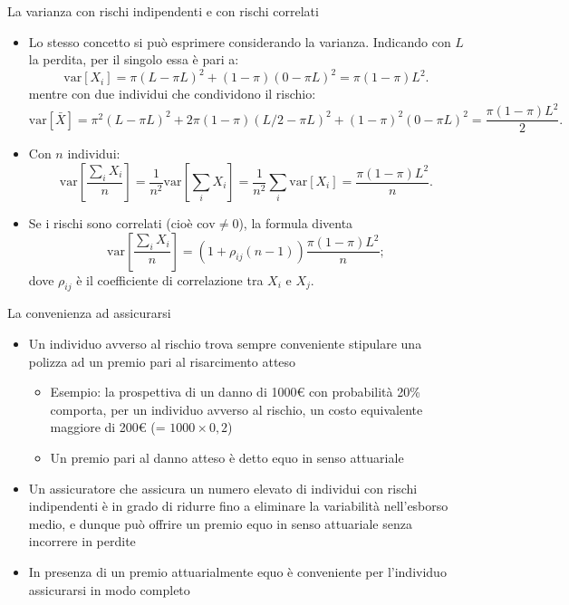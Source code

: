 \documentclass[aspectratio=149,11pt]{beamer}
\begin{document}
\begin{frame}{La varianza con rischi indipendenti e con rischi correlati}
\begin{itemize}
\item Lo stesso concetto si può esprimere considerando la varianza. Indicando con
\(L\) la perdita, per il singolo essa è pari a:
\begin{equation*}
  \text{var}[X_i]=\pi(L-\pi L)^2+(1-\pi)(0-\pi L)^2 =\pi(1-\pi)L^2.
\end{equation*}
mentre con due individui che condividono il rischio:
\begin{equation*}
\text{var}[\bar{X}] = \pi^2(L-\pi L)^2+2\pi(1-\pi)\left(L/2-\pi L\right)^2
+(1-\pi)^2(0-\pi L)^2=\frac{\pi(1-\pi)L^2}{2}.
\end{equation*}
\item Con \(n\) individui:
\begin{equation*}
  \text{var}\left[\frac{\sum_iX_i}{n}\right]
  =\frac{1}{n^2}\text{var}\left[\sum_iX_i\right]
  =\frac{1}{n^2}\sum_i\text{var}[X_i]=\frac{\pi(1-\pi)L^2}{n}.
\end{equation*}
\item Se i rischi sono correlati (cioè \(\text{cov}\not=0\)), la formula diventa
\begin{equation*}
\text{var}\left[\frac{\sum_iX_i}{n}\right]
=(1+\rho_{ij}(n-1))\frac{\pi(1-\pi)L^2}{n};
\end{equation*}
dove \(\rho_{ij}\) è il coefficiente di correlazione tra \(X_i\) e \(X_j\).
\end{itemize}
\end{frame}

\begin{frame}{La convenienza ad assicurarsi}
\begin{itemize}
\item Un individuo avverso al rischio trova sempre conveniente stipulare una polizza ad un
premio pari al risarcimento atteso
\begin{itemize}
\item Esempio: la prospettiva di un danno di 1000€ con probabilità 20\% comporta, per
un individuo avverso al rischio, un costo equivalente \alert{maggiore} di 200€
(= \(1000\times 0,2\))
\item Un premio pari al danno atteso è detto \alert{equo in senso attuariale}
\end{itemize}
\item Un assicuratore che assicura un numero elevato di individui con rischi
indipendenti è in grado di ridurre fino a eliminare la variabilità
nell'esborso medio, e dunque può offrire un premio equo in senso attuariale
senza incorrere in perdite
\item In presenza di un premio attuarialmente equo è conveniente per l'individuo
assicurarsi in modo completo
\end{itemize}
\end{frame}
\end{document}
